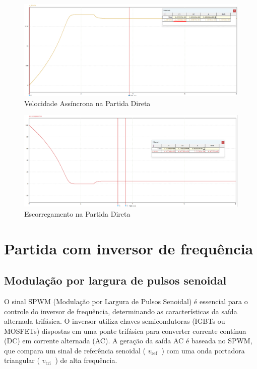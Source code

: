 \documentclass[a4paper, 11pt]{article}
\begin{document}
\begin{figure}[h]
    \centering
    \includegraphics[width=1\linewidth]{images/velocidade_partida_direta.png}
    \caption{Velocidade Assíncrona na Partida Direta}
    \label{fig:vel_assinc_direta}
\end{figure}

\begin{figure}[h]
    \centering
    \includegraphics[width=1\linewidth]{images/escorregamento_direta.png}
    \caption{Escorregamento na Partida Direta}
    \label{fig:escorrega_direta}
\end{figure}


\section{Partida com inversor de frequência}

\subsection{Modulação por largura de pulsos senoidal}

O sinal SPWM (Modulação por Largura de Pulsos Senoidal) é essencial para o controle do inversor de frequência, determinando as características da saída alternada trifásica. O inversor utiliza chaves semicondutoras (IGBTs ou MOSFETs) dispostas em uma ponte trifásica para converter corrente contínua (DC) em corrente alternada (AC). A geração da saída AC é baseada no SPWM, que compara um sinal de referência senoidal ( $v_{\text {ref }}$ ) com uma onda portadora triangular ( $v_{\text {tri }}$ ) de alta frequência.
\end{document}
